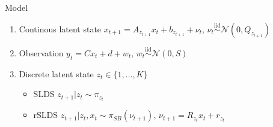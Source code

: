 \documentclass{beamer}
\begin{document}
\begin{frame}{Model}%

\begin{tcolorbox}[colback=blue!10!white,colframe=blue!50!black,title=SLDS and rSLDS,boxrule=2pt, boxsep=0.1em, left=0.1em, right=0.1em,
fontupper=\fontsize{8}{10}\selectfont] %
\begin{enumerate}[\textbullet]
\item Continous latent state $x_{t+1}=A_{z_{t+1}}x_t+b_{z_{t+1}}+\nu_t \text{, } \nu_t \overset{\mathrm{iid}}{\sim} \mathcal{N}(0,Q_{z_{t+1}})$
\item Observation $y_t=C x_t+d+w_t\text{, }w_t \overset{\mathrm{iid}}{\sim} \mathcal{N}(0,S)$
    \item Discrete latent state $z_t \in \{1,\dots,K\}$
        \begin{itemize}
            \item SLDS {\cite{Ackerson&Fu}}
$z_{t+1} | z_t \sim \pi_{z_t}$
            \item rSLDS {\cite{Barber}}
 $z_{t+1} | z_t, x_t \sim \pi_{SB}(\nu_{t+1})$, $\nu_{t+1}=R_{z_t}x_t+r_{z_t}$
        \end{itemize}
\end{enumerate}
\end{tcolorbox}
       

   


\end{frame}
\end{document}

